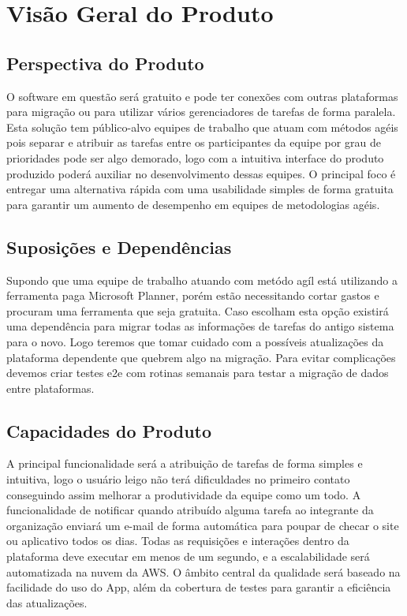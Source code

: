 \chapter{Visão Geral do Produto}

\section{Perspectiva do Produto}
O software em questão será gratuito e pode ter conexões com outras plataformas para migração ou para utilizar vários gerenciadores de tarefas de forma paralela.
Esta solução tem público-alvo equipes de trabalho que atuam com métodos agéis pois separar e atribuir as tarefas entre os participantes da equipe
por grau de prioridades pode ser algo demorado, logo com a intuitiva interface do produto produzido poderá auxiliar no desenvolvimento dessas equipes.
O principal foco é entregar uma alternativa rápida com uma usabilidade simples de forma gratuita para garantir um aumento de desempenho em equipes de metodologias agéis.

\section{Suposições e Dependências}
Supondo que uma equipe de trabalho atuando com metódo agíl está utilizando a ferramenta paga Microsoft Planner, porém estão necessitando cortar gastos e procuram uma ferramenta
que seja gratuita. Caso escolham esta opção existirá uma dependência para migrar todas as informações de tarefas do antigo sistema para o novo. Logo teremos que tomar cuidado com a
possíveis atualizações da plataforma dependente que quebrem algo na migração.
Para evitar complicações devemos criar testes \acrshort{e2e} com rotinas semanais para testar a migração de dados entre plataformas.

\section{Capacidades do Produto}
A principal funcionalidade será a atribuição de tarefas de forma simples e intuitiva, logo o usuário leigo não terá dificuldades no primeiro contato conseguindo assim
melhorar a produtividade da equipe como um todo. A funcionalidade de notificar quando atribuído alguma tarefa ao integrante da organização enviará um e-mail
de forma automática para poupar de checar o site ou aplicativo todos os dias.
Todas as requisições e interações dentro da plataforma deve executar em menos de um segundo, e a escalabilidade será automatizada na nuvem da AWS.
O âmbito central da qualidade será baseado na facilidade do uso do App, além da cobertura de testes para garantir a eficiência das atualizações.